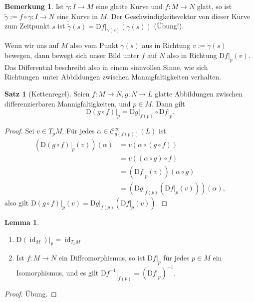 \documentclass[a4paper]{scrreprt}
\numberwithin{equation}{chapter}
\newcommand{\DD}{\mathrm{D}}
\DeclareMathOperator{\id}{id}
\newcommand{\sC}{\mathcal{C}^{\infty}}
\theoremstyle{definition}
\newtheorem{lemma}[defn]{Lemma}
\newtheorem{satz}[defn]{Satz}
\newtheorem{bem}[defn]{Bemerkung}
\newcommand{\bewUeb}{\begin{proof}Übung.\end{proof}}
\begin{document}
\begin{bem}
	Ist $\gamma\colon I \to M$ eine glatte Kurve und $f\colon M \to N$ glatt, so ist $\tilde\gamma := f\circ\gamma \colon I \to N$ eine Kurve in $M$. Der Geschwindigkeitsvektor von dieser Kurve zum Zeitpunkt $s$ ist $\dot{\tilde\gamma}(s) = \left.\DD f\right|_{\gamma(s)} (\dot\gamma(s))$ (Übung!).
	
	Wenn wir uns auf $M$ also vom Punkt $\gamma(s)$ aus in Richtung $v := \dot\gamma(s)$ bewegen, dann bewegt sich unser Bild unter $f$ auf $N$ also in Richtung $\left.\DD f\right|_p(v)$. Das Differential beschreibt also in einem sinnvollen Sinne, wie sich \glqq Richtungen\grqq\ unter Abbildungen zwischen Mannigfaltigkeiten verhalten.
\end{bem}

\begin{satz}[Kettenregel]
	Seien $f\colon M \to N, g\colon N \to L$ glatte Abbildungen zwischen differenzierbaren Mannigfaltigkeiten, und $p \in M$. Dann gilt \[\left.\DD(g\circ f)\right|_p = \left.\DD g\right|_{f(p)} \circ \left.\DD f\right|_p.\]

	\begin{proof}
		Sei $v \in T_pM$. Für jedes $\alpha \in \sC_{g(f(p))}(L)$ ist
		\begin{align*}
			\left(\left.\DD(g\circ f)\right|_p(v)\right)(\alpha) &= v(\alpha\circ (g \circ f))\\
			&= v((\alpha\circ g) \circ f)\\
			&= \left(\left.\DD f\right|_p(v)\right) (\alpha \circ g)\\
			&= \left(\left.\DD g\right|_{f(p)} \left(\left.\DD f\right|_p(v)\right)\right) (\alpha),
		\end{align*}
		also gilt $\left.\DD(g\circ f)\right|_p(v) = \left.\DD g\right|_{f(p)}\left(\left.\DD f\right|_p(v)\right)$.
	\end{proof}
\end{satz}

\begin{lemma} \label{lemma:differential_diffeo}
	\begin{enumerate}[label=(\alph*)]
		\item $\left.\DD(\id_M)\right|_p = \id_{T_pM}$
		\item Ist $f\colon M \to N$ ein Diffeomorphismus, so ist $\left.\DD f\right|_p$ für jedes $p\in M$ ein Isomorphismus, und es gilt $\left.\DD f^{-1}\right|_{f(p)} = \left(\left.\DD f\right|_p\right)^{-1}$.
	\end{enumerate}
	\bewUeb
\end{lemma}
\end{document}

